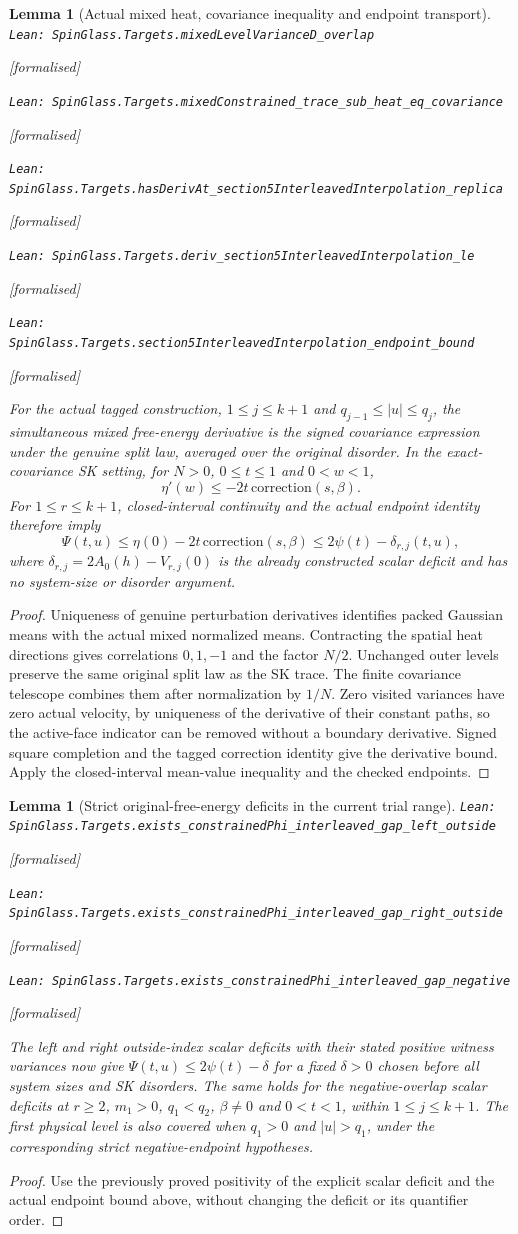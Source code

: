 \documentclass[11pt]{article}
\providecommand{\lean}[1]{\leavevmode\par\nopagebreak
  {\noindent\normalfont\footnotesize\raggedright\texttt{Lean: #1}\par}\nopagebreak}
\providecommand{\leanok}{\par\nopagebreak
  {\noindent\normalfont\footnotesize\textcolor{green!50!black}{[formalised]}\par}\nopagebreak}
\newtheorem{lemma}[theorem]{Lemma}
\begin{document}
\begin{lemma}[Actual mixed heat, covariance inequality and endpoint transport]
\lean{SpinGlass.Targets.mixedLevelVarianceD\_overlap}\leanok
\lean{SpinGlass.Targets.mixedConstrained\_trace\_sub\_heat\_eq\_covariance}\leanok
\lean{SpinGlass.Targets.hasDerivAt\_section5InterleavedInterpolation\_replica}\leanok
\lean{SpinGlass.Targets.deriv\_section5InterleavedInterpolation\_le}\leanok
\lean{SpinGlass.Targets.section5InterleavedInterpolation\_endpoint\_bound}\leanok
For the actual tagged construction, $1\le j\le k+1$ and
$q_{j-1}\le |u|\le q_j$, the simultaneous mixed free-energy derivative is
the signed covariance expression under the genuine split law, averaged
over the original disorder. In the exact-covariance SK setting, for
$N>0$, $0\le t\le1$ and $0<w<1$,
\[
 \eta'(w)\le -2t\,\mathrm{correction}(s,\beta).
\]
For $1\le r\le k+1$, closed-interval continuity and the actual endpoint
identity therefore imply
\[
 \Psi(t,u)\le\eta(0)-2t\,\mathrm{correction}(s,\beta)
 \le 2\psi(t)-\delta_{r,j}(t,u),
\]
where $\delta_{r,j}=2A_0(h)-V_{r,j}(0)$ is the already constructed scalar
deficit and has no system-size or disorder argument.
\end{lemma}
\begin{proof}
Uniqueness of genuine perturbation derivatives identifies packed Gaussian
means with the actual mixed normalized means. Contracting the spatial
heat directions gives correlations $0,1,-1$ and the factor $N/2$.
Unchanged outer levels preserve the same original split law as the SK
trace. The finite covariance telescope combines them after normalization
by $1/N$. Zero visited variances have zero actual velocity, by uniqueness
of the derivative of their constant paths, so the active-face indicator
can be removed without a boundary derivative. Signed square completion
and the tagged correction identity give the derivative bound. Apply the
closed-interval mean-value inequality and the checked endpoints.
\end{proof}

\begin{lemma}[Strict original-free-energy deficits in the current trial range]
\lean{SpinGlass.Targets.exists\_constrainedPhi\_interleaved\_gap\_left\_outside}\leanok
\lean{SpinGlass.Targets.exists\_constrainedPhi\_interleaved\_gap\_right\_outside}\leanok
\lean{SpinGlass.Targets.exists\_constrainedPhi\_interleaved\_gap\_negative}\leanok
The left and right outside-index scalar deficits with their stated positive
witness variances now give $\Psi(t,u)\le2\psi(t)-\delta$ for a fixed
$\delta>0$ chosen before all system sizes and SK disorders. The same holds
for the negative-overlap scalar deficits at $r\ge2$, $m_1>0$,
$q_1<q_2$, $\beta\ne0$ and $0<t<1$, within $1\le j\le k+1$.
The first physical level is also covered when $q_1>0$ and $|u|>q_1$,
under the corresponding strict negative-endpoint hypotheses.
\end{lemma}
\begin{proof}
Use the previously proved positivity of the explicit scalar deficit and
the actual endpoint bound above, without changing the deficit or its
quantifier order.
\end{proof}
\end{document}
